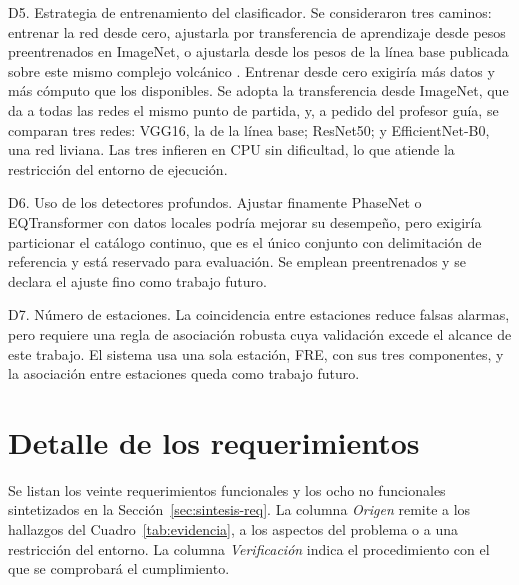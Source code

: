 D5. Estrategia de entrenamiento del clasificador. Se consideraron tres
caminos: entrenar la red desde cero, ajustarla por transferencia de aprendizaje
desde pesos preentrenados en ImageNet, o ajustarla desde los pesos de la línea
base publicada sobre este mismo complejo volcánico
\parencite{espinosacurilem2025ood}. Entrenar desde cero exigiría más datos y
más cómputo que los disponibles. Se adopta la transferencia desde ImageNet, que
da a todas las redes el mismo punto de partida, y, a pedido del profesor guía,
se comparan tres redes: VGG16, la de la línea base; ResNet50; y
EfficientNet-B0, una red liviana. Las tres infieren en CPU sin dificultad, lo
que atiende la restricción del entorno de ejecución.

D6. Uso de los detectores profundos. Ajustar finamente PhaseNet \parencite{zhu2019phasenet} o EQTransformer \parencite{mousavi2020eqtransformer} con datos locales podría mejorar su desempeño, pero exigiría particionar el
catálogo continuo, que es el único conjunto con delimitación de referencia y está
reservado para evaluación. Se emplean preentrenados y se declara el ajuste fino
como trabajo futuro.

D7. Número de estaciones. La coincidencia entre estaciones reduce falsas
alarmas, pero requiere una regla de asociación robusta cuya validación excede
el alcance de este trabajo. El sistema usa una sola estación, FRE, con sus tres
componentes, y la asociación entre estaciones queda como trabajo futuro.

\section{Detalle de los requerimientos}
\label{sec:anexo-rf}

Se listan los veinte requerimientos funcionales y los ocho no funcionales
sintetizados en la Sección~\ref{sec:sintesis-req}. La columna \emph{Origen}
remite a los hallazgos del Cuadro~\ref{tab:evidencia}, a los aspectos del
problema o a una restricción del entorno. La columna \emph{Verificación} indica
el procedimiento con el que se comprobará el cumplimiento.

